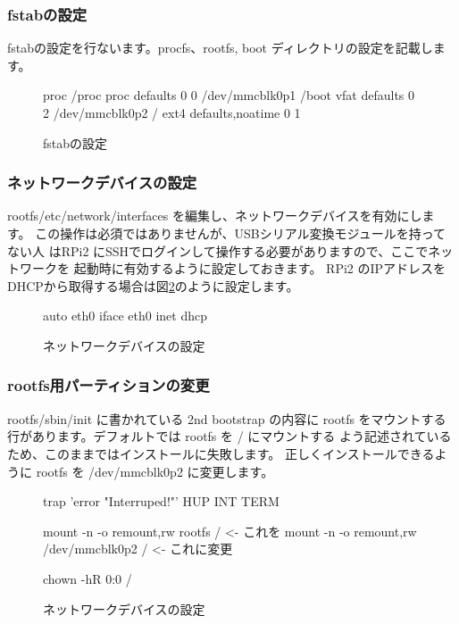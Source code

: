 \documentclass[mingoth,a4paper]{jsarticle}
\begin{document}
\subsubsection{fstabの設定}

fstabの設定を行ないます。procfs、rootfs, boot ディレクトリの設定を記載します。

\begin{figure}[htbp]
\begin{commandline}
proc            /proc           proc    defaults	0	0
/dev/mmcblk0p1  /boot           vfat    defaults	0	2
/dev/mmcblk0p2  /               ext4    defaults,noatime	0	1
\end{commandline}
\label{fig:rpiconfig}
\caption{fstabの設定}
\end{figure}

\subsubsection{ネットワークデバイスの設定}

rootfs/etc/network/interfaces を編集し、ネットワークデバイスを有効にします。
この操作は必須ではありませんが、USBシリアル変換モジュールを持ってない人
はRPi2 にSSHでログインして操作する必要がありますので、ここでネットワークを
起動時に有効するように設定しておきます。
RPi2 のIPアドレスをDHCPから取得する場合は図\ref{fig:netinterfaces}のように設定します。

\begin{figure}[htbp]
\begin{commandline}
auto eth0
iface eth0 inet dhcp
\end{commandline}
\label{fig:netinterfaces}
\caption{ネットワークデバイスの設定}
\end{figure}

\subsubsection{rootfs用パーティションの変更}

rootfs/sbin/init に書かれている 2nd bootstrap の内容に
rootfs をマウントする行があります。デフォルトでは rootfs を / にマウントする
よう記述されているため、このままではインストールに失敗します。
正しくインストールできるように rootfs を /dev/mmcblk0p2 に変更します。

\begin{figure}[htbp]
\begin{commandline}
trap 'error "Interruped!"' HUP INT TERM

mount -n -o remount,rw rootfs / <- これを
mount -n -o remount,rw /dev/mmcblk0p2 / <- これに変更

chown -hR 0:0 /
\end{commandline}
\label{fig:rpiconfig}
\caption{ネットワークデバイスの設定}
\end{figure}
\end{document}

